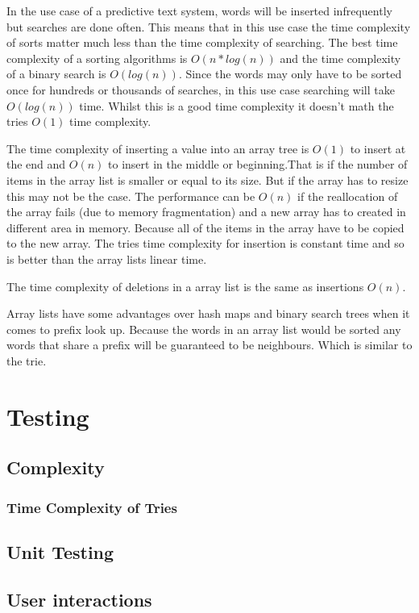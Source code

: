 \documentclass[10pt]{article} %
\begin{document}
			    In the use case of a predictive text system, words will be inserted infrequently but searches are done often. This means that in this use case the time complexity of sorts matter much less than the time complexity of searching. The best time complexity of a sorting algorithms is \begin{math} O(n * log(n)) \end{math} and the time complexity of a binary search is \begin{math}O(log(n))\end{math}. 
			    Since the words may only have to be sorted once for hundreds or thousands of searches, in this use case searching will take \begin{math}O(log(n))\end{math} time.
			    Whilst this is a good time complexity it doesn't math the tries \begin{math} O(1) \end{math} time complexity.
			    
			    The time complexity of inserting a value into an array tree is \begin{math}O(1)\end{math} to insert at the end and \begin{math}O(n)\end{math} to insert in the middle or beginning.That is if the number of items in the array list is smaller or equal to its size. But if the array has to resize this may not be the case. The performance can be \begin{math}O(n)\end{math} if the reallocation of the array fails (due to memory fragmentation) and a new array has to created in different area in memory. Because all of the items in the array have to be copied to the new array. 
			    The tries time complexity for insertion is constant time and so is better than the array lists linear time.
			
			    The time complexity of deletions in a array list is the same as insertions \begin{math}O(n)\end{math}.
			    
			    Array lists have some advantages over hash maps and binary search trees when it comes to prefix look up. Because the words in an array list would be sorted any words that share a prefix will be guaranteed to be neighbours. Which is similar to the trie.
	\section{Testing}
		\subsection{Complexity}
			\subsubsection{Time Complexity of Tries}
				

				
		\subsection{Unit Testing}
		\subsection{User interactions}
		
	\newpage
	\printbibliography
	\newpage
	
\end{document}
